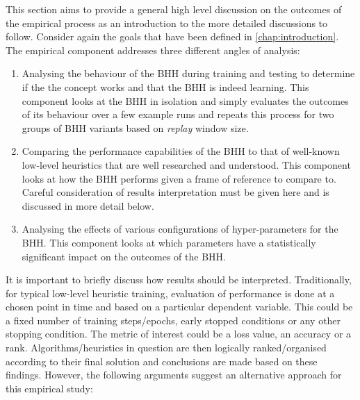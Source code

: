 This section aims to provide a general high level discussion on the outcomes of the empirical process as an introduction to the more detailed discussions to follow. Consider again the goals that have been defined in \ref{chap:introduction}. The empirical component addresses three different angles of analysis:

\begin{enumerate}
    \item Analysing the behaviour of the \Acs{BHH} during training and testing to determine if the the concept works and that the \Acs{BHH} is indeed learning. This component looks at the \Acs{BHH} in isolation and simply evaluates the outcomes of its behaviour over a few example runs and repeats this process for two groups of \Acs{BHH} variants based on \textit{replay} window size.
    
    \item Comparing the performance capabilities of the \Acs{BHH} to that of well-known low-level heuristics that are well researched and understood. This component looks at how the \Acs{BHH} performs given a frame of reference to compare to. Careful consideration of results interpretation must be given here and is discussed in more detail below.
    
    \item Analysing the effects of various configurations of hyper-parameters for the \Acs{BHH}. This component looks at which parameters have a statistically significant impact on the outcomes of the \Acs{BHH}.
\end{enumerate}

It is important to briefly discuss how results should be interpreted. Traditionally, for typical low-level heuristic training, evaluation of performance is done at a chosen point in time and based on a particular dependent variable. This could be a fixed number of training steps/epochs, early stopped conditions or any other stopping condition. The metric of interest could be a loss value, an accuracy or a rank. Algorithms/heuristics in question are then logically ranked/organised according to their final solution and conclusions are made based on these findings. However, the following arguments suggest an alternative approach for this empirical study:

